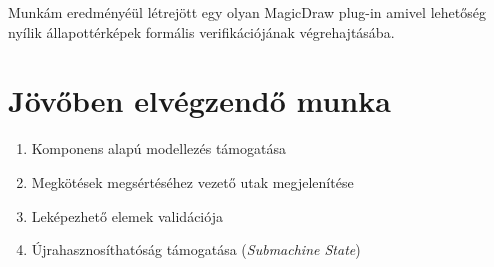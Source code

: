 Munkám eredményéül létrejött egy olyan MagicDraw plug-in amivel lehetőség nyílik állapottérképek formális verifikációjának végrehajtásába.

\section{Jövőben elvégzendő munka}
\begin{enumerate}
	\item Komponens alapú modellezés támogatása
	\item Megkötések megsértéséhez vezető utak megjelenítése
	\item Leképezhető elemek validációja
	\item Újrahasznosíthatóság támogatása (\emph{Submachine State})
\end{enumerate}


